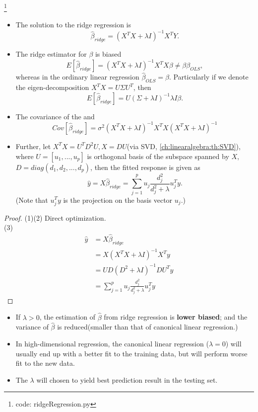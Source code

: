 \begin{refsection}
\begin{theorem}\footnote{code: ridgeRegression.py}\hfill
	\begin{itemize}
		\item The solution to the ridge regression is
		$$\hat{\beta}_{ridge} = (X^TX + \lambda I)^{-1}X^TY.$$
		\item The ridge estimator for $\beta$ is biased
		$$E[\hat{\beta}_{ridge}]=(X^TX + \lambda I)^{-1}X^TX\beta \neq \beta \beta_{OLS} ,$$
		whereas in the ordinary linear regression $\hat{\beta}_{OLS}=\beta$. 
		Particularly if we denote the eigen-decomposition $X^TX = U\Sigma U^T$, then
		$$E[\hat{\beta}_{ridge}] = U(\Sigma + \lambda I)^{-1}\lambda I \beta.$$
		\item The covariance of the 
		and
		$$ Cov[\hat{\beta}_{ridge}]=\sigma^2(X^TX + \lambda I)^{-1}X^TX(X^TX + \lambda I)^{-1}$$
		\item Further, let $X^TX = U^TD^2U, X=DU$(via SVD, \autoref{ch:linearalgebra:th:SVD}), where $U=[u_1,...,u_p]$ is orthogonal basis of the subspace spanned by $X$, $D = diag(d_1,d_2,...,d_p)$, then the fitted response is given as
		$$\hat{y} = X\hat{\beta}_{ridge} = \sum_{j=1}^p u_j\frac{d_j^2}{d_j^2 + \lambda} u_j^Ty.$$
		(Note that $u_j^Ty$ is the projection on the basis vector $u_j$.)
	\end{itemize}
\end{theorem}
\begin{proof}
	(1)(2) Direct optimization. \\(3)
	\begin{align*}
	\hat{y} &= X\hat{\beta}_{ridge}\\
	&=X(X^TX + \lambda I)^{-1}X^Ty\\
	&=UD(D^2 + \lambda I)^{-1}DU^Ty\\
	&=\sum_{j=1}^p u_j\frac{d_j^2}{d_j^2 + \lambda} u_j^Ty 
	\end{align*} 
\end{proof}


\begin{remark}\hfill
	\begin{itemize}
		\item If $\lambda > 0$, the estimation of $\hat{\beta}$ from ridge regression is \textbf{lower biased}; and the variance of $\hat{\beta}$ is reduced(smaller than that of canonical linear regression.)
		\item In high-dimensional regression, the canonical linear regression ($\lambda = 0$) will usually end up with a better fit to the training data, but will perform worse fit to the new data.
		\item The $\lambda$ will chosen to yield best prediction result in the testing set. 
	\end{itemize}
\end{remark}



\end{refsection}
